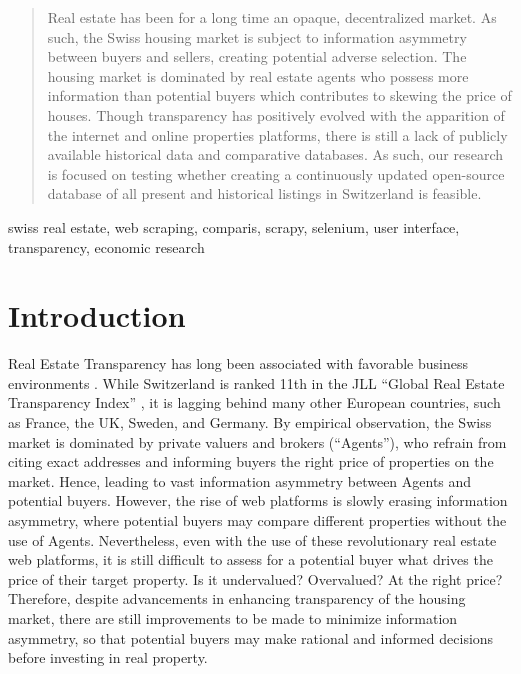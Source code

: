 \documentclass[main]{subfiles}
\begin{document}
\begin{abstract}
    Real estate has been for a long time an opaque, decentralized market. As such, the Swiss housing market is subject to information asymmetry between buyers and sellers, creating potential adverse selection. The housing market is dominated by real estate agents who possess more information than potential buyers which contributes to skewing the price of houses.
    Though transparency has positively evolved with the apparition of the internet and online properties platforms, there is still a lack of publicly available historical data and comparative databases.
    As such, our research is focused on testing whether creating a continuously updated open-source database of all present and historical listings in Switzerland is feasible. 
    
\end{abstract}
    
\begin{IEEEkeywords}
swiss real estate, web scraping, comparis, scrapy, selenium, user interface, transparency, economic research
\end{IEEEkeywords}
    
\section{Introduction}
Real Estate Transparency has long been associated with favorable business environments \cite{RealEstateTransparency}.
 While Switzerland is ranked 11th in the JLL “Global Real Estate Transparency Index” \cite{GlobalRealEstate}, 
 it is lagging behind many other European countries, such as France, the UK, Sweden, and Germany. 
By empirical observation, the Swiss market is dominated by private valuers and brokers (“Agents”), 
who refrain from citing exact addresses and informing buyers the right price of properties on the market. 
Hence, leading to vast information asymmetry between Agents and potential buyers.
However, the rise of web platforms is slowly erasing information asymmetry,
 where potential buyers may compare different properties without the use of Agents. 
 Nevertheless, even with the use of these revolutionary real estate web platforms, 
 it is still difficult to assess for a potential buyer what drives the price of their target property. 
 Is it undervalued? Overvalued? At the right price?
Therefore, despite advancements in enhancing transparency of the housing market, 
there are still improvements to be made to minimize information asymmetry, 
so that potential buyers may make rational and informed decisions before investing in real property.
\end{document}
